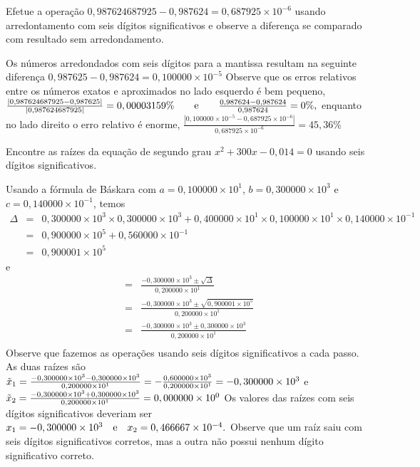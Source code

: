 \begin{ex}Efetue a operação
$
0,987624687925-0,987624=0,687925\times 10^{-6}
$
usando arredontamento com seis dígitos significativos e observe a diferença se comparado com resultado sem arredondamento.

Os números arredondados com seis dígitos para a mantissa resultam na seguinte diferença
$
0,987625-0,987624=0,100000\times 10^{-5}
$
Observe que os erros relativos entre os números exatos e aproximados no lado esquerdo é bem pequeno,
$
\frac{|0,987624687925-0,987625|}{|0,987624687925|}=0,00003159\%\qquad\hbox{e}\qquad \frac{0,987624-0,987624}{0,987624}=0\%,
$
enquanto no lado direito o erro relativo é enorme,
$
\frac{|0,100000\times 10^{-5}-0,687925\times 10^{-6}|}{0,687925\times 10^{-6}}=45,36\%
$

\end{ex}

\begin{ex} Encontre as raízes da equação de segundo grau
$
x^2+300x-0,014=0
$
usando seis dígitos significativos.

Usando a fórmula de Báskara com $a=0,100000\times 10^1$, $b=0,300000\times 10^3$ e $c=0,140000\times 10^{-1}$, temos
\begin{eqnarray*}
\Delta&=&0,300000\times 10^3\times 0,300000\times 10^3 +0,400000\times 10^1\times 0,100000\times 10^1\times 0,140000\times 10^{-1}\\
&=&0,900000\times 10^5 +0,560000\times  10^{-1}\\
&=&0,900001\times 10^5
\end{eqnarray*}
e
\begin{eqnarray*}
&=&\frac{-0,300000\times 10^3\pm \sqrt{\Delta}}{0,200000\times 10^1} \\
&=&\frac{-0,300000\times 10^3\pm \sqrt{0,900001\times 10^5}}{0,200000\times 10^1} \\
&=&\frac{-0,300000\times 10^3\pm 0,300000\times 10^3}{0,200000\times 10^1}\\
\end{eqnarray*}
Observe que fazemos as operações usando seis dígitos significativos a cada passo. As duas raízes são
$
\tilde{x}_1=\frac{-0,300000\times 10^3- 0,300000\times 10^3}{0,200000\times 10^1}=-\frac{0,600000\times 10^3}{0,200000\times 10^1}=-0,300000\times 10^3\\
$
e
$
\tilde{x}_2=\frac{-0,300000\times 10^3+ 0,300000\times 10^3}{0,200000\times 10^1}=0,000000\times 10^{0}\\
$
Os valores das raízes com seis dígitos significativos deveriam ser
$
x_1=-0,300000\times 10^{3}\quad\hbox{e}\quad x_2=0,466667\times 10^{-4}.
$
Observe que um raíz saiu com seis dígitos significativos corretos, mas a outra não possui nenhum dígito significativo correto.
\end{ex}


